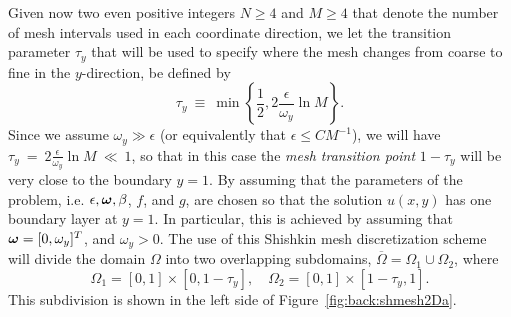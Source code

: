 Given now two even positive integers $N\geq 4$ and $M\geq 4$ that denote the
number of mesh intervals used in each coordinate direction, we let the
transition parameter $\tau_y$ that will be used to specify where the mesh
changes from coarse to fine in the $y$-direction, be defined by
%
\begin{equation}\label{eq:back:tau_y}
\tau_y~\equiv~\min\left\{\frac{1}{2},2\frac{\epsilon}{\omega_y}  \ln M\right\}.
\end{equation}
%
Since we assume $\omega_y\gg \epsilon$ (or equivalently that
$\epsilon \leq CM^{-1}$), we will have
$\tau_y~=~2\frac{\epsilon}{\omega_y}\ln M~\ll~1$,
so that in this case the \emph{mesh transition point} $1-\tau_y$ will be very
close to the boundary $y=1$. By assuming that the parameters of the problem,
i.e. $\epsilon, \bm{\omega}, \beta$, $f$, and  $g$, are chosen so that the solution
$u(x,y)$ has one boundary layer at $y=1$. In particular, this is achieved by
assuming that $\bm{\omega}=[0,\omega_y]^T$, and $\omega_y>0$. The use of this Shishkin
mesh discretization scheme will divide the domain $\Omega$ into two overlapping
subdomains, $\overline{\Omega}=\Omega_{1}\cup\Omega_{2}$, where
%
$$
\Omega_{1}=[0,1]\times[0,1-\tau_y],\quad\Omega_{2}=[0,1]\times[1-\tau_y,1].
$$
%
This subdivision is shown in the left side of Figure~\ref{fig:back:shmesh2Da}.
%

